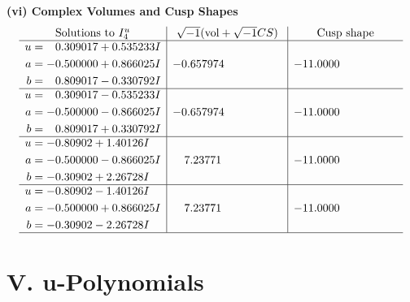 \documentclass[1p]{elsarticle_modified}
\theoremstyle{definition}
\newcommand{\I}{\sqrt{-1}}
\begin{document}
\newpage\flushleft \textbf{(vi) Complex Volumes and Cusp Shapes}
$$\begin{array}{c|c|c}  
\text{Solutions to }I^u_{4}& \I (\text{vol} + \sqrt{-1}CS) & \text{Cusp shape}\\
 \hline 
\begin{aligned}
u &= \phantom{-}0.309017 + 0.535233 I \\
a &= -0.500000 + 0.866025 I \\
b &= \phantom{-}0.809017 - 0.330792 I\end{aligned}
 & -0.657974\phantom{ +0.000000I} & -11.0000\phantom{ +0.000000I} \\ \hline\begin{aligned}
u &= \phantom{-}0.309017 - 0.535233 I \\
a &= -0.500000 - 0.866025 I \\
b &= \phantom{-}0.809017 + 0.330792 I\end{aligned}
 & -0.657974\phantom{ +0.000000I} & -11.0000\phantom{ +0.000000I} \\ \hline\begin{aligned}
u &= -0.80902 + 1.40126 I \\
a &= -0.500000 - 0.866025 I \\
b &= -0.30902 + 2.26728 I\end{aligned}
 & \phantom{-}7.23771\phantom{ +0.000000I} & -11.0000\phantom{ +0.000000I} \\ \hline\begin{aligned}
u &= -0.80902 - 1.40126 I \\
a &= -0.500000 + 0.866025 I \\
b &= -0.30902 - 2.26728 I\end{aligned}
 & \phantom{-}7.23771\phantom{ +0.000000I} & -11.0000\phantom{ +0.000000I}\\
 \hline 
 \end{array}$$\newpage
\newpage\renewcommand{\arraystretch}{1}
\centering \section*{ V. u-Polynomials}
\end{document}
